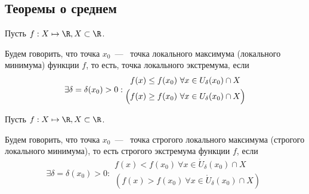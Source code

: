 \subsection{Теоремы о среднем}

\begin{definition}
	Пусть $f : X \mapsto \R, X \subset \R$.
	
	Будем говорить, что точка $x_{0}$~---~ \textrm{точка локального максимума (локального минимума) функции $f$, то есть, точка локального экстремума,} если 
	$$\exists \delta = \delta (x_{0}) > 0: \begin{gathered}
		f(x) \leq f(x_{0}) \ \forall x \in U_{\delta}(x_{0}) \cap X\\
		\Bigl( f(x) \geq f(x_{0}) \ \forall x \in U_{\delta}(x_{0}) \cap X\Bigr) 
		\end{gathered}$$
\end{definition}

\begin{definition}
	Пусть $f : X \mapsto \R, X \subset \R$.
	
	Будем говорить, что точка $x_{0}$~---~ \textrm{точка строгого локального максимума (строгого локального минимума), то есть строгого экстремума функции $f$,} если 
	$$\exists \delta = \delta (x_{0}) > 0: \begin{gathered}
		f(x) < f(x_{0}) \ \forall x \in \mathring{U}_{\delta}(x_{0}) \cap X\\
		\left( f(x) > f(x_{0}) \ \forall x \in \mathring{U}_{\delta}(x_{0}) \cap X\right) 
	\end{gathered}$$
\end{definition}

